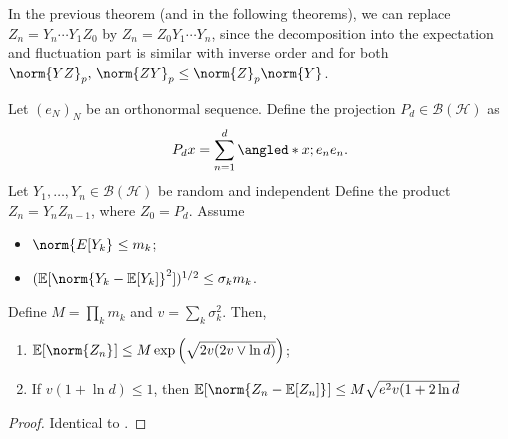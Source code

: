 \begin{remark}
    In the previous theorem (and in the following theorems), we can replace 
    \( Z_n = Y_n\cdots Y_1 Z_0 \) by \( Z_n = Z_0 Y_1 \cdots Y_n \), since the decomposition into the expectation and fluctuation part is similar with inverse order and for both \( \norm{YZ}_p,\,\norm{ZY}_{p} \leq \norm{Z}_p \norm{Y} \).
\end{remark}


\begin{corl}
    Let \( (e_N)_N \) be an orthonormal sequence. Define the projection \( P_d\in \mathcal{B}(\mathcal{H}) \) as 
    \[ P_dx = \sum_{n=1}^{d} \angled*{x;e_n}e_n. \]
    Let \( Y_1,\dots,Y_n \in \mathcal{B}(\mathcal{H})\) be random and independent
    Define the product \( Z_n = Y_nZ_{n-1} \), where \( Z_0=P_d \).
    Assume 
    \begin{itemize}
      \item \( \norm{E[Y_k}_{} \leq m_k \);
      \item \( (\mathbb{E}[\norm{Y_k-\mathbb{E}[Y_k]}_{}^{2}])^{1/2} \leq \sigma_k m_k \).
    \end{itemize}
    Define \( M= \prod_{k}^{}m_k \) and \( v= \sum_{k}^{} \sigma_k^{2} \). Then,
    \begin{enumerate}[1)]
      \item \( \mathbb{E}[\norm{Z_n}_{}] \leq M\exp\left(\sqrt{2v(2v \vee \operatorname{ln}d)}\right) \);
      \item If \( v(1+ \operatorname{ln}d ) \leq 1\), then \( \mathbb{E}[\norm{Z_n - \mathbb{E}[Z_n]}_{}] \leq  M\sqrt{e^{2}v(1+2 \operatorname{ln}d} \)
    \end{enumerate}
    
\end{corl}
 \begin{proof}
   Identical to \cite{huang2020matrix}.
 \end{proof}


